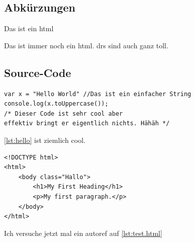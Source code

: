 \documentclass[\maintextsize, \papersize, fleqn, xcolor=dvipsnames]{scrartcl}
\begin{document}
\subsection{Abkürzungen}\label{subsec:abbrev}
	
Das ist ein \ac{html}
	
\newpage
	
Das ist immer noch ein \ac{html}. \acp{dr} sind auch ganz toll.
	
\subsection{Source-Code}\label{subsec:code}
	
\begin{lstlisting}[style=htmlcssjs,float=h,caption={JavaScript Hello World Beispiel},label=lst:hello]
var x = "Hello World" //Das ist ein einfacher String
console.log(x.toUppercase());
/* Dieser Code ist sehr cool aber
effektiv bringt er eigentlich nichts. Hähäh */
\end{lstlisting}
	
\autoref{lst:hello} ist ziemlich cool.

\begin{lstlisting}[style=htmlcssjs,float=h,caption={Einfaches HTML Beispiel},label=lst:html]
<!DOCTYPE html>
<html>
	<body class="Hallo">
		<h1>My First Heading</h1>
		<p>My first paragraph.</p>
	</body>
</html>
\end{lstlisting}


Ich versuche jetzt mal ein autoref auf \autoref{lst:test.html}
	
\end{document}

